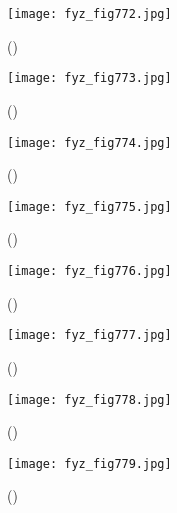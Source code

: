    \begin{figure}[ht!] %
      \centering
      \texttt{[image: fyz\_fig772.jpg]}
      \caption{
               (\cite[s.~707]{Feynman02})}
      \label{fyz_fig772}
    \end{figure}

    \begin{figure}[ht!] %
      \centering
      \texttt{[image: fyz\_fig773.jpg]}
      \caption{
               (\cite[s.~707]{Feynman02})}
      \label{fyz_fig773}
    \end{figure}

    \begin{figure}[ht!] %
      \centering
      \texttt{[image: fyz\_fig774.jpg]}
      \caption{
               (\cite[s.~707]{Feynman02})}
      \label{fyz_fig774}
    \end{figure}

    \begin{figure}[ht!] %
      \centering
      \texttt{[image: fyz\_fig775.jpg]}
      \caption{
               (\cite[s.~707]{Feynman02})}
      \label{fyz_fig775}
    \end{figure}

    \begin{figure}[ht!] %
      \centering
      \texttt{[image: fyz\_fig776.jpg]}
      \caption{
               (\cite[s.~707]{Feynman02})}
      \label{fyz_fig776}
    \end{figure}

    \begin{figure}[ht!] %
      \centering
      \texttt{[image: fyz\_fig777.jpg]}
      \caption{
               (\cite[s.~707]{Feynman02})}
      \label{fyz_fig777}
    \end{figure}

    \begin{figure}[ht!] %
      \centering
      \texttt{[image: fyz\_fig778.jpg]}
      \caption{
               (\cite[s.~707]{Feynman02})}
      \label{fyz_fig778}
    \end{figure}

    \begin{figure}[ht!] %
      \centering
      \texttt{[image: fyz\_fig779.jpg]}
      \caption{
               (\cite[s.~707]{Feynman02})}
      \label{fyz_fig779}
    \end{figure}

